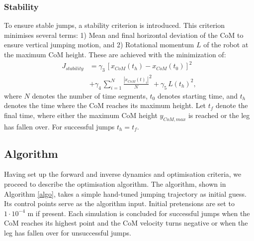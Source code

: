 \documentclass[letterpaper, 10 pt, conference]{ieeeconf}  %
\begin{document}
\subsubsection{Stability}
To ensure stable jumps, a stability criterion is introduced. This criterion minimises several terms: 1) Mean and final horizontal deviation of the CoM to ensure vertical jumping motion, and 2) Rotational momentum $L$ of the robot at the maximum CoM height.
These are achieved with the minimization of:
\begin{equation}
	\begin{aligned}
		J_{stability} & =  \gamma_3 \, \left[ x_{CoM}(t_h) - x_{CoM}(t_0) \right]^2 \\
		& + \gamma_4 \, \sum^{N}_{i=1}\frac{| x_{CoM}(t)_i |}{N}^2   
+ \gamma_5 \, L(t_h)^2,
	\end{aligned}
\end{equation}
where $N$ denotes the number of time segments, $t_0$ denotes starting time, and $t_h$ denotes the time where the CoM reaches its maximum height. Let $t_f$ denote the final time, where either the maximum CoM height $y_{CoM,max}$ is reached or the leg has fallen over. For successful jumps $t_h=t_f$.

\subsection{Algorithm}
\label{subsec:algorithm}
Having set up the forward and inverse dynamics and optimisation criteria, we proceed to describe the optimisation algorithm. The algorithm, shown in Algorithm \ref{algo}, takes a simple hand-tuned jumping trajectory as initial guess. Its control points serve as the algorithm input. Initial pretensions are set to $1 \cdot 10^{-4}$ m if present. Each simulation is concluded for successful jumps when the CoM reaches its highest point and the CoM velocity turns negative  or when the leg has fallen over for unsuccessful jumps. 
\end{document}
